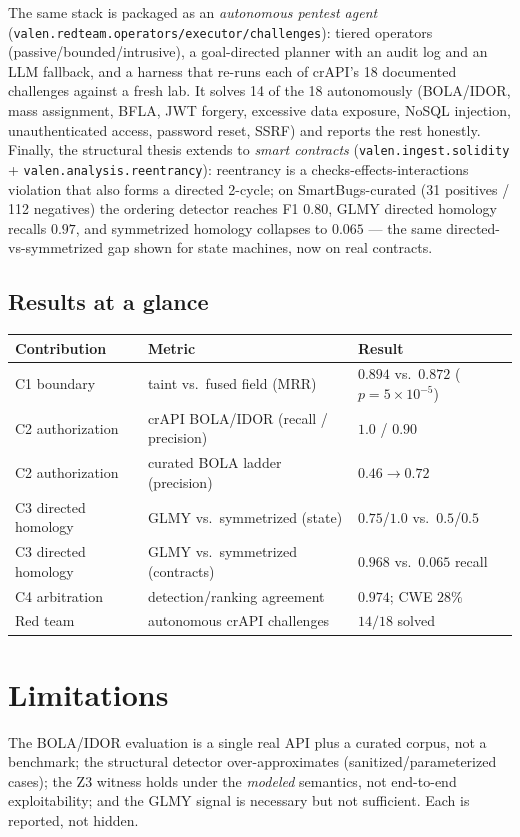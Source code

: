 \documentclass[11pt]{article}
\begin{document}
The same stack is packaged as an \emph{autonomous pentest agent}
(\texttt{valen.redteam.operators/executor/challenges}): tiered operators
(passive/bounded/intrusive), a goal-directed planner with an audit log and an
LLM fallback, and a harness that re-runs each of crAPI's 18 documented
challenges against a fresh lab. It solves 14 of the 18 autonomously (BOLA/IDOR, mass assignment, BFLA,
JWT forgery, excessive data exposure, NoSQL injection, unauthenticated access,
password reset, SSRF) and reports the rest honestly.
Finally, the structural thesis extends to \emph{smart contracts}
(\texttt{valen.ingest.solidity} + \texttt{valen.analysis.reentrancy}): reentrancy
is a checks-effects-interactions violation that also forms a directed 2-cycle;
on SmartBugs-curated (31 positives / 112 negatives) the ordering detector
reaches F1 $0.80$, GLMY directed homology recalls $0.97$, and symmetrized
homology collapses to $0.065$ --- the same directed-vs-symmetrized gap shown for
state machines, now on real contracts.

\subsection{Results at a glance}
\begin{center}
\small
\begin{tabular}{@{}lll@{}}
\toprule
\textbf{Contribution} & \textbf{Metric} & \textbf{Result} \\
\midrule
C1 boundary & taint vs.\ fused field (MRR) & $0.894$ vs.\ $0.872$ ($p=5\times10^{-5}$) \\
C2 authorization & crAPI BOLA/IDOR (recall / precision) & $1.0$ / $0.90$ \\
C2 authorization & curated BOLA ladder (precision) & $0.46\to0.72$ \\
C3 directed homology & GLMY vs.\ symmetrized (state) & $0.75$/$1.0$ vs.\ $0.5$/$0.5$ \\
C3 directed homology & GLMY vs.\ symmetrized (contracts) & $0.968$ vs.\ $0.065$ recall \\
C4 arbitration & detection/ranking agreement & $0.974$; CWE $28\%$ \\
Red team & autonomous crAPI challenges & $14/18$ solved \\
\bottomrule
\end{tabular}
\end{center}



\section{Limitations}
The BOLA/IDOR evaluation is a single real API plus a curated corpus, not a
benchmark; the structural detector over-approximates (sanitized/parameterized
cases); the Z3 witness holds under the \emph{modeled} semantics, not end-to-end
exploitability; and the GLMY signal is necessary but not sufficient. Each is
reported, not hidden.
\end{document}
